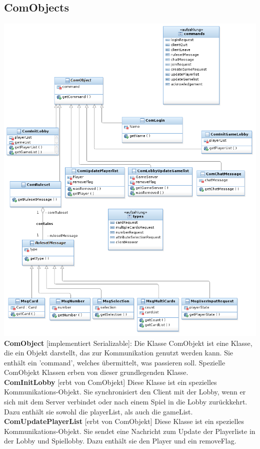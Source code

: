 \documentclass{article}
\begin{document}
\subsection{ComObjects}
\includegraphics[width=\textwidth]{ComDiagram}
\textbf{ComObject} [implementiert Serializable]: Die Klasse ComObjekt ist eine Klasse, die ein Objekt darstellt, das zur Kommunikation genutzt werden kann. Sie enthält ein 'command', welches übermittelt, was passieren soll. Spezielle ComObjekt Klassen erben von dieser grundlegenden Klasse.\\

\textbf{ComInitLobby} [erbt von ComObjekt] Diese Klasse ist ein spezielles Kommunikations-Objekt. Sie synchronisiert den Client mit der Lobby, wenn er sich mit dem Server verbindet oder nach einem Spiel in die Lobby zurückkehrt. Dazu enthält sie sowohl die playerList, als auch die gameList.\\

\textbf{ComUpdatePlayerList} [erbt von ComObjekt] Diese Klasse ist ein spezielles Kommunikations-Objekt. Sie sendet eine Nachricht zum Update der Playerliste in der Lobby und Spiellobby. Dazu enthält sie den Player und ein removeFlag.\\
		
\end{document}
